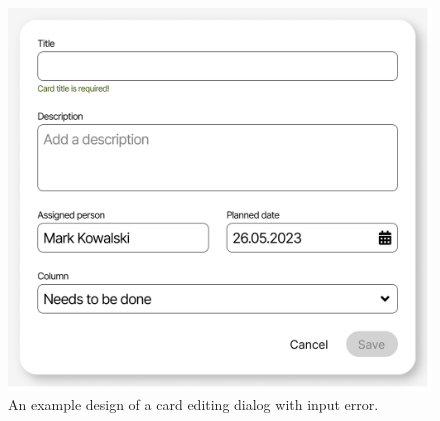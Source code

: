 \begin{figure}
    \centering
    \includegraphics[height=0.4\textheight]{./3-research-methodology/card-dialog-with-error}
    \caption{An example design of a card editing dialog with input error.}
    \label{fig:3-4-card-dialog-with-error}
\end{figure}

